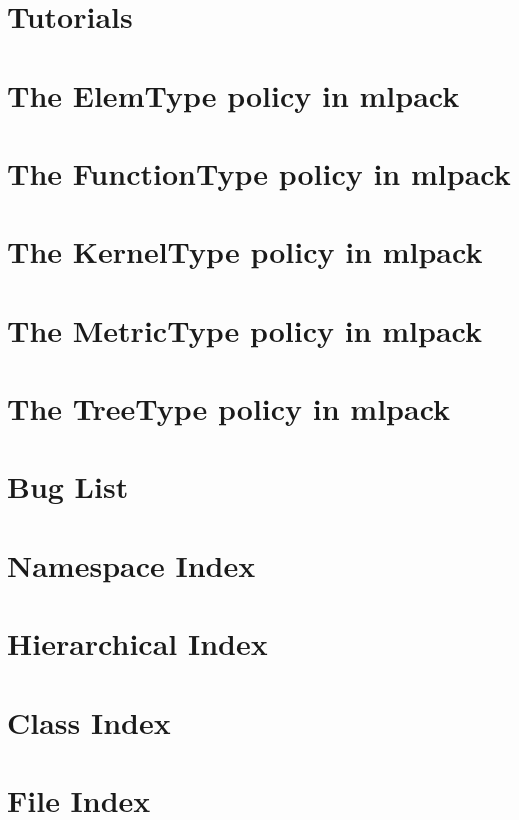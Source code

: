 \let\mypdfximage\pdfximage\def\pdfximage{\immediate\mypdfximage}\documentclass[twoside]{book}
\newcommand{\+}{\discretionary{\mbox{\scriptsize$\hookleftarrow$}}{}{}}
\begin{document}
\chapter{Tutorials}
\label{tutorials}

\chapter{The Elem\+Type policy in mlpack}
\label{elem}

\chapter{The Function\+Type policy in mlpack}
\label{function}

\chapter{The Kernel\+Type policy in mlpack}
\label{kernels}

\chapter{The Metric\+Type policy in mlpack}
\label{metrics}

\chapter{The Tree\+Type policy in mlpack}
\label{trees}

\chapter{Bug List}
\label{bug}

\chapter{Namespace Index}

\chapter{Hierarchical Index}

\chapter{Class Index}

\chapter{File Index}

\end{document}
